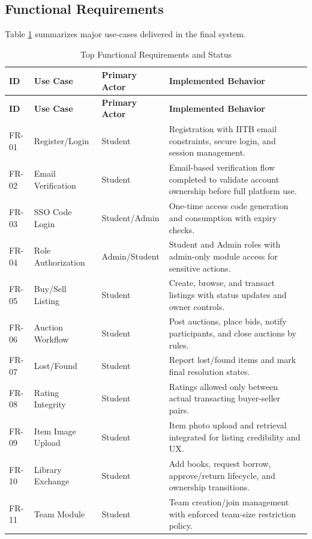 \documentclass[12pt,a4paper]{article}
\begin{document}
\subsection{Functional Requirements}
Table \ref{tab:functional-req} summarizes major use-cases delivered in the final system.

\begin{longtable}{p{} p{} p{} p{}}
\caption{Top Functional Requirements and Status} \label{tab:functional-req} \\
\toprule
\textbf{ID} & \textbf{Use Case} & \textbf{Primary Actor} & \textbf{Implemented Behavior} \\
\midrule
\endfirsthead
\toprule
\textbf{ID} & \textbf{Use Case} & \textbf{Primary Actor} & \textbf{Implemented Behavior} \\
\midrule
\endhead
FR-01 & Register/Login & Student & Registration with IITB email constraints, secure login, and session management. \\
FR-02 & Email Verification & Student & Email-based verification flow completed to validate account ownership before full platform use. \\
FR-03 & SSO Code Login & Student/Admin & One-time access code generation and consumption with expiry checks. \\
FR-04 & Role Authorization & Admin/Student & Student and Admin roles with admin-only module access for sensitive actions. \\
FR-05 & Buy/Sell Listing & Student & Create, browse, and transact listings with status updates and owner controls. \\
FR-06 & Auction Workflow & Student & Post auctions, place bids, notify participants, and close auctions by rules. \\
FR-07 & Lost/Found & Student & Report lost/found items and mark final resolution states. \\
FR-08 & Rating Integrity & Student & Ratings allowed only between actual transacting buyer-seller pairs. \\
FR-09 & Item Image Upload & Student & Item photo upload and retrieval integrated for listing credibility and UX. \\
FR-10 & Library Exchange & Student & Add books, request borrow, approve/return lifecycle, and ownership transitions. \\
FR-11 & Team Module & Student & Team creation/join management with enforced team-size restriction policy. \\

\end{longtable}
\end{document}
